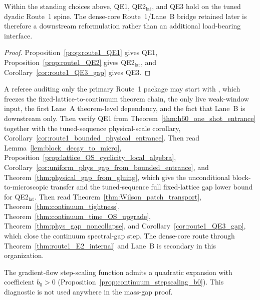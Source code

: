 \begin{theorem}\label{thm:route1_laneB_package}
Within the standing choices above, QE1, QE2$_{\mathrm{lat}}$, and QE3 hold on the tuned dyadic Route~1 spine.
The dense-core Route~1/Lane~B bridge retained later is therefore a downstream reformulation rather than an additional load-bearing interface.
\end{theorem}

\begin{proof}
Proposition~\ref{prop:route1_QE1} gives QE1, Proposition~\ref{prop:route1_QE2} gives QE2$_{\mathrm{lat}}$, and Corollary~\ref{cor:route1_QE3_gap} gives QE3.
\end{proof}

\begin{remark}
A referee auditing only the primary Route~1 package may start with , which freezes the fixed-lattice-to-continuum theorem chain, the only live weak-window input, the first Lane~A theorem-level dependency, and the fact that Lane~B is downstream only.
Then verify QE1 from Theorem~\ref{thm:h60_one_shot_entrance} together with the tuned-sequence physical-scale corollary, Corollary~\ref{cor:route1_bounded_physical_entrance}.
Then read Lemma~\ref{lem:block_decay_to_micro}, Proposition~\ref{prop:lattice_OS_cyclicity_local_algebra}, Corollary~\ref{cor:uniform_phys_gap_from_bounded_entrance}, and Theorem~\ref{thm:physical_gap_from_gluing}, which give the unconditional block-to-microscopic transfer and the tuned-sequence full fixed-lattice gap lower bound for QE2$_{\mathrm{lat}}$.
Then read Theorem~\ref{thm:Wilson_patch_transport}, Theorem~\ref{thm:continuum_tightness}, Theorem~\ref{thm:continuum_time_OS_upgrade}, Theorem~\ref{thm:phys_gap_noncollapse}, and Corollary~\ref{cor:route1_QE3_gap}, which close the continuum spectral-gap step.
The dense-core route through Theorem~\ref{thm:route1_E2_internal} and Lane~B is secondary in this organization.
\end{remark}

\begin{corollary}\label{cor:b0_optional}
The gradient-flow step-scaling function admits a quadratic expansion with coefficient $b_0>0$
(Proposition~\ref{prop:continuum_stepscaling_b0}).
This diagnostic is not used anywhere in the mass-gap proof.
\end{corollary}

